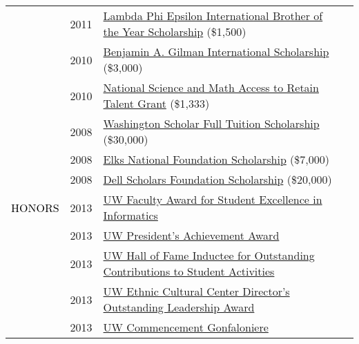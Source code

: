 \documentclass[12pt]{article}
\begin{document}
{{\begin{longtable}{Rp{1.0in}p{0.25in}p{4.75in}}
& \footnotesize{2011} & \href{http://lambdaphiepsilon.com/resources/\#academicachievement}{{Lambda Phi Epsilon International Brother of the Year Scholarship}} (\$1,500) \\

& \footnotesize{2010} & \href{http://depts.washington.edu/uwhonors/news/brief/?id=61}{{Benjamin A. Gilman International Scholarship}} (\$3,000) \\

& \footnotesize{2010} & \href{http://www2.ed.gov/programs/smart/index.html}{{National Science and Math Access to Retain Talent Grant}} (\$1,333) \\

& \footnotesize{2008} & \href{http://www.wsac.wa.gov/}{{Washington Scholar Full Tuition Scholarship}} (\$30,000) \\

& \footnotesize{2008} & \href{http://www.elks.org/enf/scholars/}{{Elks National Foundation Scholarship}} (\$7,000) \\

& \footnotesize{2008} & \href{https://www.dellscholars.org/}{{Dell Scholars Foundation Scholarship}} (\$20,000) \\

\textcolor{black}{\footnotesize{\uppercase{Honors}}} & \footnotesize{2013} & \href{https://ischool.uw.edu/feature-stories/2013-ischool-convocation-celebrates-achievement-and-community}{{UW Faculty Award for Student Excellence in Informatics}} \\

& \footnotesize{2013} & \href{http://www.washington.edu/omad/celebration/recognition-scholarship-recipients/2013-celebration-scholarship-recipients/}{{UW President’s Achievement Award}} \\

& \footnotesize{2013} & \href{http://depts.washington.edu/thehub/hub-events/hub-awards/}{{UW Hall of Fame Inductee for Outstanding Contributions to Student Activities}} \\

& \footnotesize{2013} & \href{https://www.facebook.com/EthnicCulturalCenter/photos/a.10151638127531422.1073741830.124987626421/10151638128881422/}{{UW Ethnic Cultural Center Director’s Outstanding Leadership Award}} \\

& \footnotesize{2013} & \href{https://www.facebook.com/UWiSchool/posts/10151645734368695}{{UW Commencement Gonfaloniere}} \\


\end{longtable}}}
\end{document}
